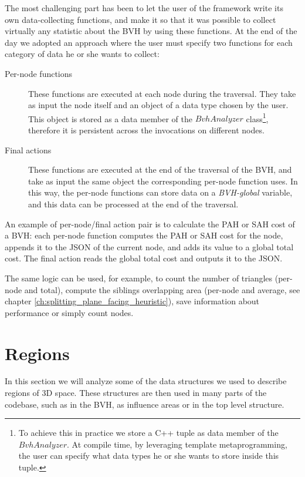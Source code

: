\documentclass{PoliMi_MasterThesis}
\begin{document}
The most challenging part has been to let the user of the framework write its own data-collecting functions, and make it so that it was possible to collect virtually any statistic about the BVH by using these functions. At the end of the day we adopted an approach where the user must specify two functions for each category of data he or she wants to collect:
\begin{description}
	\item[Per-node functions] These functions are executed at each node during the traversal. They take as input the node itself and an object of a data type chosen by the user. This object is stored as a data member of the $BvhAnalyzer$ class\footnote{To achieve this in practice we store a C++ tuple as data member of the $BvhAnalyzer$. At compile time, by leveraging template metaprogramming, the user can specify what data types he or she wants to store inside this tuple.}, therefore it is persistent across the invocations on different nodes.
	\item[Final actions] These functions are executed at the end of the traversal of the BVH, and take as input the same object the corresponding per-node function uses. In this way, the per-node functions can store data on a \textit{BVH-global} variable, and this data can be processed at the end of the traversal.  
\end{description}

An example of per-node/final action pair is to calculate the PAH or SAH cost of a BVH: each per-node function computes the PAH or SAH cost for the node, appends it to the JSON of the current node, and adds its value to a global total cost. The final action reads the global total cost and outputs it to the JSON.

The same logic can be used, for example, to count the number of triangles (per-node and total), compute the siblings overlapping area (per-node and average, see chapter \ref{ch:splitting_plane_facing_heuristic}), save information about performance or simply count nodes.

\section{Regions} \label{sec:regions}
In this section we will analyze some of the data structures we used to describe regions of 3D space. These structures are then used in many parts of the codebase, such as in the BVH, as influence areas or in the top level structure. 
\end{document}
